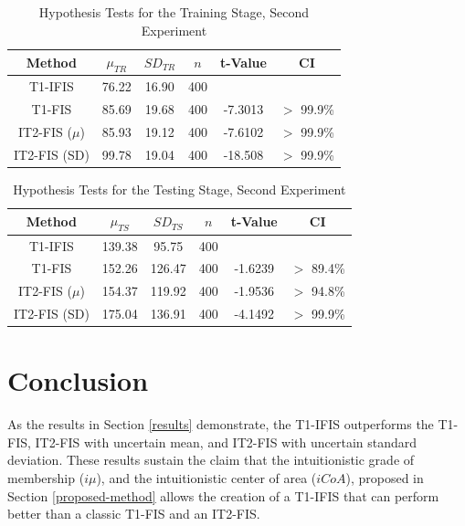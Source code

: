 \documentclass[conference]{IEEEtran}
\begin{document}
\begin{table}[!t]
  \renewcommand{\arraystretch}{1.3}
  \caption{Hypothesis Tests for the Training Stage, Second Experiment}
  \label{second-hypothesis-tests-training}
  \centering
  \begin{tabular}{|c|c|c|c|c|c|}
    \hline
    Method & $\mu_{TR}$ & $SD_{TR}$ & $n$ & t-Value & CI\\
    \hline
    T1-IFIS & 76.22 & 16.90 & 400 & & \\
    \hline
    T1-FIS & 85.69 & 19.68 & 400 & -7.3013 & $>$ 99.9\% \\
    \hline
    IT2-FIS (\(\mu\)) & 85.93 & 19.12 & 400 & -7.6102 & $>$ 99.9\%\\
    \hline
    IT2-FIS (SD) & 99.78 & 19.04 & 400 & -18.508 & $>$ 99.9\% \\
    \hline
  \end{tabular}
\end{table}


\begin{table}[!t]
  \renewcommand{\arraystretch}{1.3}
  \caption{Hypothesis Tests for the Testing Stage, Second Experiment}
  \label{second-hypothesis-tests-testing}
  \centering
  \begin{tabular}{|c|c|c|c|c|c|}
    \hline
    Method & $\mu_{TS}$ & $SD_{TS}$ & $n$ & t-Value & CI\\
    \hline
    T1-IFIS & 139.38 & 95.75 & 400 &  &  \\
    \hline
    T1-FIS & 152.26 & 126.47 & 400 & -1.6239 & $>$ 89.4\% \\
    \hline
    IT2-FIS (\(\mu\)) & 154.37 & 119.92 & 400 & -1.9536 & $>$ 94.8\% \\
    \hline
    IT2-FIS (SD) & 175.04 & 136.91 & 400 & -4.1492 & $>$ 99.9\%\\
    \hline
  \end{tabular}
\end{table}

\section{Conclusion}
\label{conclusion}

As the results in Section \ref{results} demonstrate, the T1-IFIS
outperforms the T1-FIS, IT2-FIS with uncertain mean, and IT2-FIS with
uncertain standard deviation. These results sustain the claim that the
intuitionistic grade of membership ($i\mu$), and the intuitionistic center
of area ($iCoA$), proposed in Section \ref{proposed-method} allows the
creation of a T1-IFIS that can perform better than a classic T1-FIS
and an IT2-FIS.
\end{document}
